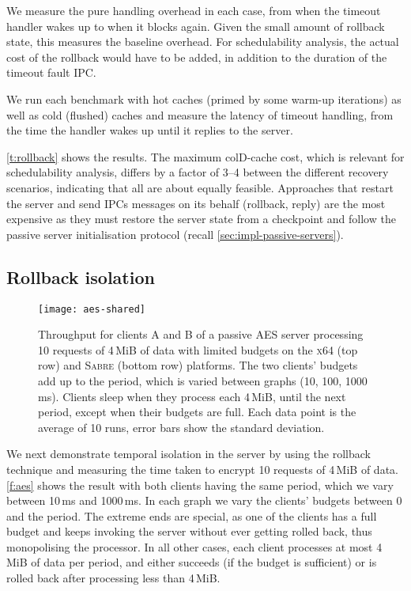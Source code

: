 We measure the pure handling overhead in each case, from when the timeout handler wakes up to when
it blocks again.  Given the small amount of rollback state, this measures the baseline overhead. For
schedulability analysis, the actual cost of the rollback would have to be added, in addition to the
duration of the timeout fault IPC. 
 
We run each benchmark with hot caches (primed by some warm-up
iterations)  as well as cold (flushed) caches and measure the 
latency of timeout handling, from the time the handler wakes up
until it replies to the server.

\autoref{t:rollback} shows the results. The maximum
colD-cache cost, which is relevant for schedulability analysis, differs by a factor of 3--4 between
the different recovery scenarios, indicating that all are about equally feasible.  Approaches that
restart the server and send \glspl{IPC} messages on its behalf (rollback, reply) are the most
expensive as they must restore the server state from a checkpoint and follow the passive server
initialisation protocol (recall \cref{sec:impl-passive-servers}). 

\subsection{Rollback isolation}

\begin{figure}[t]
  \centering
  \texttt{[image: aes-shared]}
  \caption[Results of AES server isolation benchmark.]{Throughput for clients A and B of a passive AES server processing 10 requests of 4\,MiB of data with
      limited budgets on the \textsc{x64} (top row) and \textsc{Sabre} (bottom row) platforms. The two clients' budgets
      add up to the period, which is varied between graphs (10, 100, 1000\,ms). Clients sleep when
      they process each 4\,MiB, until the next period, except when their budgets are full. Each data point is the average of 10 runs, error bars show the standard deviation.}
  \label{f:aes}
\end{figure}

We next demonstrate temporal isolation in the server by using the rollback
technique and measuring the time taken to encrypt 10 requests of 4\,MiB of
data. \autoref{f:aes} shows the result with both clients having the same
period, which we vary between 10\,ms and 1000\,ms.
In each graph we vary the clients' budgets between 0 and the
period. The extreme ends are special, as one of the clients has a full
budget and keeps invoking the server without ever getting rolled back,
thus monopolising the processor. In all other cases, each client
processes at most 4\,MiB of data per period, and either succeeds (if
the budget is sufficient) or is rolled back after processing less than 4\,MiB.

